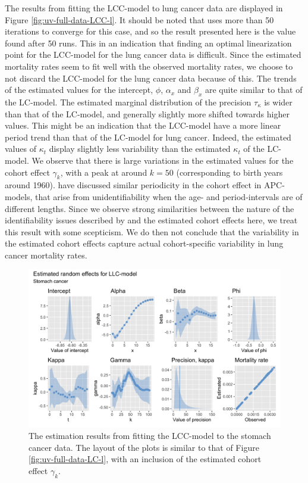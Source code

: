 \newpar The results from fitting the LCC-model to lung cancer data are displayed in Figure \ref{fig:uv-full-data-LCC-l}. It should be noted that \inlabru uses more than 50 iterations to converge for this case, and so the result presented here is the value found after 50 runs. This in an indication that finding an optimal linearization point for the LCC-model for the lung cancer data is difficult. Since the estimated mortality rates seem to fit well with the observed mortality rates, we choose to not discard the LCC-model for the lung cancer data because of this. The trends of the estimated values for the intercept, $\phi$, $\alpha_x$ and $\beta_x$ are quite similar to that of the LC-model. The estimated marginal distribution of the precision $\tau_\kappa$ is wider than that of the LC-model, and generally slightly more shifted towards higher values. This might be an indication that the LCC-model have a more linear period trend than that of the LC-model for lung cancer. Indeed, the estimated values of $\kappa_t$ display slightly less variability than the estimated $\kappa_t$ of the LC-model. We observe that there is large variations in the estimated values for the cohort effect $\gamma_k$, with a peak at around $k = 50$ (corresponding to birth years around 1960). \textcite{RieblerThesis2010} have discussed similar periodicity in the cohort effect in APC-models, that arise from unidentifiability when the age- and period-intervals are of different lengths. Since we observe strong similarities between the nature of the identifiability issues described by \textcite{RieblerThesis2010} and the estimated cohort effects here, we treat this result with some scepticism. We do then not conclude that the variability in the estimated cohort effects capture actual cohort-specific variability in lung cancer mortality rates. 

\begin{figure}[h!]
    \centering
    \includegraphics[width=0.85\linewidth]{real-data/real-data-univariate/Figures/uv-full-data-lcc-s.png}
    \caption{The estimation results from fitting the LCC-model to the stomach cancer data. The layout of the plots is similar to that of Figure \ref{fig:uv-full-data-LC-l}, with an inclusion of the estimated cohort effect $\gamma_k$.}
    \label{fig:uv-full-data-LCC-s}
\end{figure}

